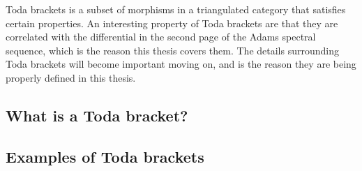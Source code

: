 Toda brackets is a subset of morphisms in a triangulated category that satisfies certain properties. An interesting property of Toda brackets are that they are correlated with the differential in the second page of the Adams spectral sequence, which is the reason this thesis covers them. The details surrounding Toda brackets will become important moving on, and is the reason they are being properly defined in this thesis.

\subsection{What is a Toda bracket?}


\subsection{Examples of Toda brackets}

